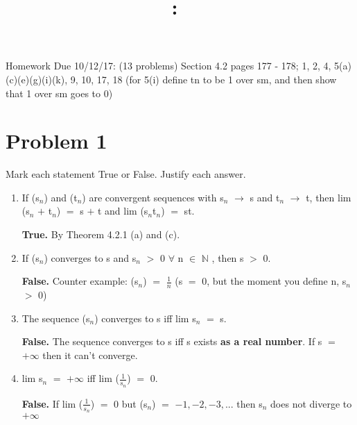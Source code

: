 \documentclass{article}
\title{
    \vspace{2in}
    \textmd{\textbf{\hmwkClass:\ \hmwkTitle}}\\
    \normalsize\vspace{0.1in}\small\vspace{0.1in}\large{\textit{\hmwkClassInstructor}}
    \vspace{3in}
}
\author{\hmwkAuthorName}
\date{}
\newcommand{\mt}[1]{\ensuremath{#1}}
\newcommand\bsc[2][\DefaultOpt]{%
  \def\DefaultOpt{#2}%
  \section[#1]{#2}%
}
\newcommand{\balist}{\begin{enumerate}[label=\alph*.]}
\newcommand{\elist}{\end{enumerate}}
\newcommand{\bn}{\mt{\mathbb{N}} }       %
\newcommand{\fa}{\mt{\forall} }          %
\newcommand{\mem}{\mt{\in} }
\newcommand{\lra}{ \mt{\longrightarrow} } %
\newcommand{\prn}[1]{(#1)}
\newcommand{\ps}{\mt{+} }
\newcommand{\gr}{\mt{>} }
\newcommand{\eql}{\mt{=} }
\newcommand{\uw}[2]{#1\mt{_{#2}}}
\newcommand{\frc}[2]{\mt{\frac{#1}{#2}}}
\begin{document}
Homework Due 10/12/17: (13 problems) Section 4.2 pages 177 - 178; 1, 2, 4, 5(a)(c)(e)(g)(i)(k), 9, 10, 17, 18 (for 5(i) define tn to be 1 over sm, and then show that 1 over sm goes to 0)

\bsc{Problem 1}{
Mark each statement True or False. Justify each answer.

\balist
\item If \prn{\uw{s}{n}} and (\uw{t}{n}) are convergent sequences with \uw{s}{n} \lra s and \uw{t}{n} \lra t, then lim (\uw{s}{n} \ps \uw{t}{n}) \eql s \ps t and lim (\uw{s}{n}\uw{t}{n}) \eql st.
	
	\textbf{True.} By Theorem 4.2.1 (a) and (c).
\item If \prn{\uw{s}{n}} converges to s and \uw{s}{n} \gr 0 \fa n \mem \bn, then s \gr 0.
	
	\textbf{False.} Counter example: \prn{\uw{s}{n}} \eql \frc{1}{n} (s \eql 0, but the moment you define n, \uw{s}{n} \gr 0)
\item The sequence \prn{\uw{s}{n}} converges to s iff lim \uw{s}{n} \eql s.
	
	\textbf{False.} The sequence converges to s iff s exists \textbf{as a real number}. If s \eql $+\infty$ then it can't converge.
\item lim \uw{s}{n} \eql $+\infty$ iff lim (\frc{1}{\uw{s}{n}}) \eql 0.
	
	\textbf{False.} If lim (\frc{1}{\uw{s}{n}}) \eql 0 but \prn{\uw{s}{n}} \eql $-1, -2, -3, ...$ then \uw{s}{n} does not diverge to $+\infty$
\elist
}
\end{document}
